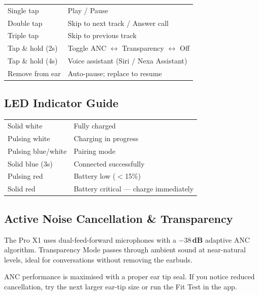\begin{tabularx}{\linewidth}{@{}K@{\hspace{8mm}}>{\raggedright\arraybackslash}X@{}}
\setlength{\parskip}{0pt}%
Single tap        & Play / Pause \\
Double tap        & Skip to next track / Answer call \\
Triple tap        & Skip to previous track \\
Tap \& hold (2s)  & Toggle ANC $\leftrightarrow$ Transparency $\leftrightarrow$ Off \\
Tap \& hold (4s)  & Voice assistant (Siri / Nexa Assistant) \\
Remove from ear   & Auto-pause; replace to resume \\
\end{tabularx}

\subsection{LED Indicator Guide}

\begin{tabularx}{\linewidth}{@{}K@{\hspace{8mm}}>{\raggedright\arraybackslash}X@{}}
\setlength{\parskip}{0pt}%
Solid white       & Fully charged \\
Pulsing white     & Charging in progress \\
Pulsing blue/white & Pairing mode \\
Solid blue (3s)   & Connected successfully \\
Pulsing red       & Battery low ($<$15\%) \\
Solid red         & Battery critical — charge immediately \\
\end{tabularx}

\subsection{Active Noise Cancellation \& Transparency}

The Pro X1 uses dual-feed-forward microphones with a \textbf{$-38$\,dB} adaptive ANC
algorithm. Transparency Mode passes through ambient sound at near-natural levels,
ideal for conversations without removing the earbuds.

\begin{tipbox}
  ANC performance is maximised with a proper ear tip seal. If you notice reduced
  cancellation, try the next larger ear-tip size or run the Fit Test in the app.
\end{tipbox}

\newpage


